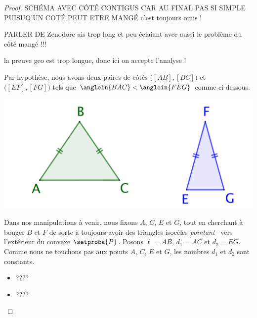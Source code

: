 \begin{proof}
	SCHÉMA AVEC CÔTÉ CONTIGUS CAR AU FINAL PAS SI SIMPLE PUISUQ'UN COTÉ PEUT ETRE MANGÉ
	c'est toujours omis !
	
	PARLER DE Zenodore ais trop long et peu éclaiant avec aussi le problème du côté mangé !!!
	
	la preuve geo est trop longue, donc ici on accepte l'analyse !
	
	Par hypothèse, nous avons deux paires de côtés
	$\big( [AB] , [BC] \big)$ et
	$\big( [EF] , [FG] \big)$ tels que
	$\anglein{BAC} < \anglein{FEG}$ comme ci-dessous.
	\begin{center}
		\includegraphics[scale=.4]{content/polygon/necessary-cond/2-eq-angles.png}
	\end{center}

	
	Dans nos manipulations à venir, nous fixons $A$, $C$, $E$ et $G$, tout en cherchant à bouger $B$ et $F$ de sorte à toujours avoir des triangles isocèles \og \emph{pointant} \fg\ vers l'extérieur du convexe $\setproba{P}$.
	Posons $\ell = AB$, $d_1 = AC$ et $d_2 = EG$. Comme nous ne touchons pas aux points $A$, $C$, $E$ et $G$, les nombres $d_1$ et $d_2$ sont constants.
	\begin{itemize}
		\item ????

		\item ????
	\end{itemize}



\end{proof}
